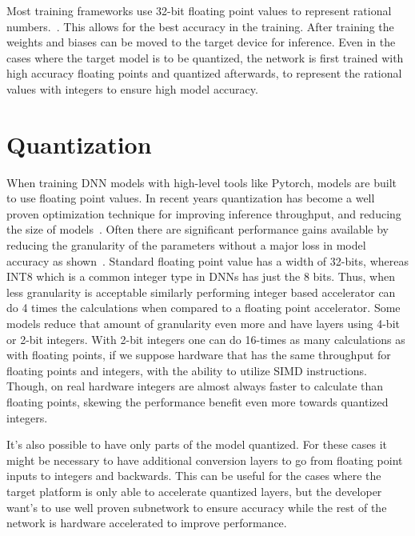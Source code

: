 \documentclass[12pt,a4paper,english
]{tunithesis}
\begin{document}
Most training frameworks use 32-bit floating point values to represent rational numbers.~\cite{paszke_pytorch_2019}\cite{tensorflow2015-whitepaper}. This allows for the best accuracy in the training. After training the weights and biases can be moved to the target device for inference. Even in the cases where the target model is to be quantized, the network is first trained with high accuracy floating points and quantized afterwards, to represent the rational values with integers to ensure high model accuracy.

\section{Quantization}
When training DNN models with high-level tools like Pytorch, models are built to use floating point values. In recent years quantization has become a well proven optimization technique for improving inference throughput, and reducing the size of models~\cite{wu_integer_2020}. Often there are significant performance gains available by reducing the granularity of the parameters without a major loss in model accuracy as shown~\cite{krishnamoorthi_quantizing_2018,draghici_capabilities_2002}. Standard floating point value has a width of 32-bits, whereas INT8 which is a common integer type in DNNs has just the 8 bits. Thus, when less granularity is acceptable similarly performing integer based accelerator can do 4 times the calculations when compared to a floating point accelerator.
Some models reduce that amount of granularity even more and have layers using 4-bit or 2-bit integers. With 2-bit integers one can do 16-times as many calculations as with floating points, if we suppose hardware that has the same throughput for floating points and integers, with the ability to utilize SIMD instructions. Though, on real hardware integers are almost always faster to calculate than floating points, skewing the performance benefit even more towards quantized integers.

It's also possible to have only parts of the model quantized. For these cases it might be necessary to have additional conversion layers to go from floating point inputs to integers and backwards. This can be useful for the cases where the target platform is only able to accelerate quantized layers, but the developer want's to use well proven subnetwork to ensure accuracy while the rest of the network is hardware accelerated to improve performance.
\end{document}
